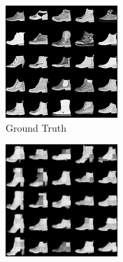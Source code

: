 \begin{figure}[H]
    \centering
    \begin{subfigure}[b]{0.24\textwidth}
        \centering
        \includegraphics[width=\textwidth]{figures/einsum/fashion-mnist/9fashion-mnist_ground_truth.png}
        \caption{Ground Truth}
    \end{subfigure}
    \begin{subfigure}[b]{0.24\textwidth}
        \centering
        \includegraphics[width=\textwidth]{figures/einsum/fashion-mnist/9fashion-mnist_EM.png}

\end{subfigure}
\end{figure}
